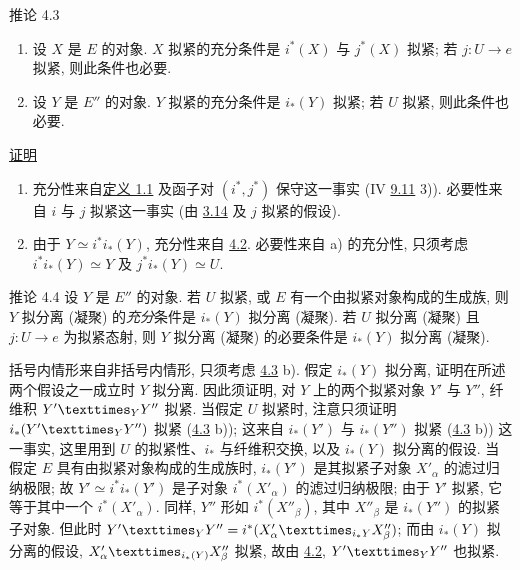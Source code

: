 \begin{enonce*}{推论 4.3}
\begin{enumerate}
\renewcommand{\theenumi}{\alph{enumi}}
\renewcommand{\labelenumi}{\theenumi)}
\item 设 $X$ 是 $E$ 的对象.
$X$ 拟紧的充分条件是 $i^{\ast}(X)$ 与 $j^{\ast}(X)$ 拟紧;
若 $j:U\to e$ 拟紧, 则此条件也必要.

\item 设 $Y$ 是 $E''$ 的对象.
$Y$ 拟紧的充分条件是 $i_{\ast}(Y)$ 拟紧;
若 $U$ 拟紧, 则此条件也必要.
\end{enumerate}
\end{enonce*}

\noindent
\underline{证明}
\begin{enumerate}
\renewcommand{\theenumi}{\alph{enumi}}
\renewcommand{\labelenumi}{\theenumi)}
\item 充分性来自\hyperref[VI.def1.1]{定义 1.1}
及函子对 $(i^{\ast},j^{\ast})$ 保守这一事实
(IV \hyperlink{sga4.exp.IV.proposition.9.4.1.item.c}{9.11} 3)).
必要性来自 $i$ 与 $j$ 拟紧这一事实
(由 \hyperref[VI.prop4.2]{3.14} 及 $j$ 拟紧的假设).

\item 由于 $Y\simeq i^{\ast}i_{\ast}(Y)$,
充分性来自 \hyperref[VI.prop4.2]{4.2}.
必要性来自 a) 的充分性,
只须考虑 $i^{\ast}i_{\ast}(Y)\simeq Y$
及 $j^{\ast}i_{\ast}(Y)\simeq U$.
\end{enumerate}

\begin{enonce*}{推论 4.4}
设 $Y$ 是 $E''$ 的对象.
若 $U$ 拟紧, 或 $E$ 有一个由拟紧对象构成的生成族,
则 $Y$ 拟分离 (\resp 凝聚) 的\emph{充分}条件是
$i_{\ast}(Y)$ 拟分离 (\resp 凝聚).
若 $U$ 拟分离 (\resp 凝聚) 且 $j:U\to e$ 为拟紧态射,
则 $Y$ 拟分离 (\resp 凝聚) 的必要条件是
$i_{\ast}(Y)$ 拟分离 (\resp 凝聚).
\end{enonce*}

括号内\pageoriginale{}情形来自非括号内情形,
只须考虑 \hyperref[VI.cor4.3]{4.3} b).
假定 $i_{\ast}(Y)$ 拟分离,
证明在所述两个假设之一成立时 $Y$ 拟分离.
因此须证明, 对 $Y$ 上的两个拟紧对象 $Y'$ 与 $Y''$,
纤维积 $\fprod{Y'}{Y''}{Y}$ 拟紧.
当假定 $U$ 拟紧时,
注意只须证明 $i_{\ast}(\fprod{Y'}{Y''}{Y})$ 拟紧
(\hyperref[VI.cor4.3]{4.3} b));
这来自 $i_{\ast}(Y')$ 与 $i_{\ast}(Y'')$ 拟紧
(\hyperref[VI.cor4.3]{4.3} b)) 这一事实,
这里用到 $U$ 的拟紧性、$i_{\ast}$ 与纤维积交换,
以及 $i_{\ast}(Y)$ 拟分离的假设.
当假定 $E$ 具有由拟紧对象构成的生成族时,
$i_{\ast}(Y')$ 是其拟紧子对象 ${X'}_{\alpha}$ 的滤过归纳极限;
故 $Y'\simeq i^{\ast}i_{\ast}(Y')$
是子对象 $i^{\ast}({X'}_{\alpha})$ 的滤过归纳极限;
由于 $Y'$ 拟紧, 它等于其中一个 $i^{\ast}({X'}_{\alpha})$.
同样, $Y''$ 形如 $i^{\ast}({X''}_{\beta})$,
其中 ${X''}_{\beta}$ 是 $i_{\ast}(Y'')$ 的拟紧子对象.
但此时
$\fprod{Y'}{Y''}{Y}=
i^{\ast}(\fprod{X'_{\alpha}}{X''_{\beta}}{i_{\ast}Y})$;
而由 $i_{\ast}(Y)$ 拟分离的假设,
$\fprod{X'_{\alpha}}{X''_{\beta}}{i_{\ast}(Y)}$ 拟紧,
故由 \hyperref[VI.prop4.2]{4.2},
$\fprod{Y'}{Y''}{Y}$ 也拟紧.

